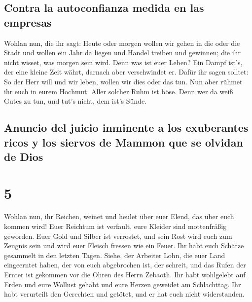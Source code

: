 \hypertarget{contra-la-autoconfianza-medida-en-las-empresas}{%
\subsection{Contra la autoconfianza medida en las
empresas}\label{contra-la-autoconfianza-medida-en-las-empresas}}

 Wohlan nun, die ihr sagt: Heute oder morgen wollen wir
gehen in die oder die Stadt und wollen ein Jahr da liegen und Handel
treiben und gewinnen;  die ihr nicht wisset, was morgen
sein wird. Denn was ist euer Leben? Ein Dampf ist's, der eine kleine
Zeit währt, darnach aber verschwindet er.  Dafür ihr
sagen solltet: So der Herr will und wir leben, wollen wir dies oder das
tun.  Nun aber rühmet ihr euch in eurem Hochmut. Aller
solcher Ruhm ist böse.  Denn wer da weiß Gutes zu tun,
und tut's nicht, dem ist's Sünde.

\hypertarget{anuncio-del-juicio-inminente-a-los-exuberantes-ricos-y-los-siervos-de-mammon-que-se-olvidan-de-dios}{%
\subsection{Anuncio del juicio inminente a los exuberantes ricos y los
siervos de Mammon que se olvidan de
Dios}\label{anuncio-del-juicio-inminente-a-los-exuberantes-ricos-y-los-siervos-de-mammon-que-se-olvidan-de-dios}}

\hypertarget{section-4}{%
\section{5}\label{section-4}}

 Wohlan nun, ihr Reichen, weinet und heulet über euer
Elend, das über euch kommen wird!  Euer Reichtum ist
verfault, eure Kleider sind mottenfräßig geworden.  Euer
Gold und Silber ist verrostet, und sein Rost wird euch zum Zeugnis sein
und wird euer Fleisch fressen wie ein Feuer. Ihr habt euch Schätze
gesammelt in den letzten Tagen.  Siehe, der Arbeiter Lohn,
die euer Land eingeerntet haben, der von euch abgebrochen ist, der
schreit, und das Rufen der Ernter ist gekommen vor die Ohren des Herrn
Zebaoth.  Ihr habt wohlgelebt auf Erden und eure Wollust
gehabt und eure Herzen geweidet am Schlachttag.  Ihr habt
verurteilt den Gerechten und getötet, und er hat euch nicht
widerstanden.

